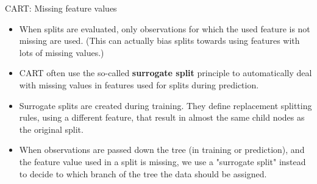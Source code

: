 \begin{vbframe}{CART: Missing feature values}
  \begin{itemize}
    \item When splits are evaluated, only observations for which the used feature is not missing are used. (This can actually bias splits towards using features with lots of missing values.) 
  \item CART often use the so-called \textbf{surrogate split} principle to automatically deal with missing values in features used for splits during prediction.
  \item Surrogate splits are created during training. They define replacement splitting rules, using a different feature, that result in almost the same child nodes as the original split.
   \item When observations are passed down the tree (in training or prediction), and the feature value used in a split is missing, we use a "surrogate split" instead to decide to which branch of the tree the data should be assigned. 
  \end{itemize}
\end{vbframe}

\endlecture

